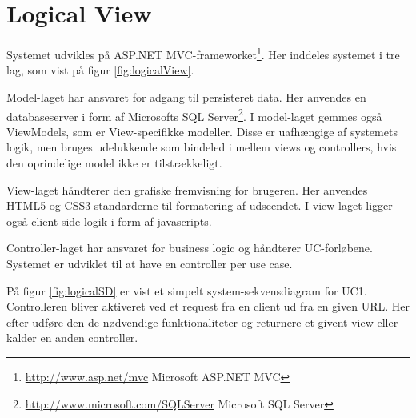 \section{Logical View}\label{sec:LogicalView}
Systemet udvikles på ASP.NET MVC-frameworket\footnote{\url{http://www.asp.net/mvc} Microsoft ASP.NET MVC}. Her inddeles systemet i tre lag, som vist på figur \ref{fig:logicalView}.


Model-laget har ansvaret for adgang til persisteret data. Her anvendes en databaseserver i form af Microsofts SQL Server\footnote{\url{http://www.microsoft.com/SQLServer} Microsoft SQL Server}. I model-laget gemmes også ViewModels, som er View-specifikke modeller. Disse er uafhængige af systemets logik, men bruges udelukkende som bindeled i mellem views og controllers, hvis den oprindelige model ikke er tilstrækkeligt.

View-laget håndterer den grafiske fremvisning for brugeren. Her anvendes HTML5 og CSS3 standarderne til formatering af udseendet. I view-laget ligger også client side logik i form af javascripts.

Controller-laget har ansvaret for business logic og håndterer UC-forløbene. Systemet er udviklet til at have en controller per use case.

På figur \ref{fig:logicalSD} er vist et simpelt system-sekvensdiagram for UC1. Controlleren bliver aktiveret ved et request fra en client ud fra en given URL. Her efter udføre den de nødvendige funktionaliteter og returnere et givent view eller kalder en anden controller.

